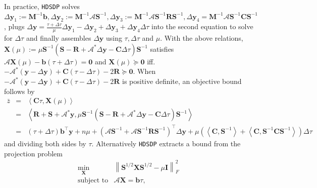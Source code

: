 \documentclass[10pt]{article}
\begin{document}
{In practice, {{\texttt{HDSDP}}} solves $\Delta \mathbf{y}_1 := \mathbf{M}^{- 1} \mathbf{b},
\Delta \mathbf{y}_2 := \mathbf{M}^{- 1} \mathcal{A} \mathbf{S}^{- 1}, \Delta \mathbf{y}_3 := \mathbf{M}^{- 1} \mathcal{A}
\mathbf{S}^{- 1} \mathbf{R} \mathbf{S}^{- 1}, \Delta \mathbf{y}_4 = \mathbf{M}^{- 1} \mathcal{A} \mathbf{S}^{- 1} \mathbf{C} \mathbf{S}^{-
1}$, plugs $\Delta \mathbf{y} = \frac{\tau + \Delta \tau}{\mu} \Delta \mathbf{y}_1 - \Delta
\mathbf{y}_2 + \Delta \mathbf{y}_3 + \Delta \mathbf{y}_4 \Delta \tau$ into the second equation to
solve for $\Delta \tau$ and finally assembles $\Delta \mathbf{y}$ using $\tau, \Delta
\tau$ and $\mu$. With the above relations, $\mathbf{X} (\mu) := \mu \mathbf{S}^{- 1}
\left( \mathbf{S} - \mathbf{R} +\mathcal{A}^{\ast} \Delta \mathbf{y} - \mathbf{C} \Delta \tau \right) \mathbf{S}^{-
1}$ satisfies $\mathcal{A} \mathbf{X} (\mu) - \mathbf{b} (\tau + \Delta \tau) = \textbf{0}$ and $\mathbf{X} (\mu)
\succeq \textbf{0}$ iff. $-\mathcal{A}^{\ast} \left( \mathbf{y} - \Delta \mathbf{y} \right) + \mathbf{C} (\tau
- \Delta \tau) - 2 \mathbf{R} \succeq \textbf{0}$. When $-\mathcal{A}^{\ast} \left( \mathbf{y} -
\Delta \mathbf{y} \right) + \mathbf{C} (\tau - \Delta \tau) - 2 \mathbf{R}$ is positive definite, an
objective bound follows by
\begin{eqnarray*}
  \bar{z} & = & \left\langle \mathbf{C} \tau, \mathbf{X} (\mu) \right\rangle\\
  & = & \left\langle \mathbf{R} + \mathbf{S} + \mathcal{A}^{\ast} \mathbf{y}, \mu \mathbf{S}^{- 1} \left( \mathbf{S} - \mathbf{R}
  +\mathcal{A}^{\ast} \Delta \mathbf{y} - \mathbf{C} \Delta \tau \right) \mathbf{S}^{- 1}
  \right\rangle\\
  & = & (\tau + \Delta \tau) \mathbf{b}^{\top} \mathbf{y} + n \mu + \left( \mathcal{A} \mathbf{S}^{- 1} +
  \mathcal{A} \mathbf{S}^{- 1} \mathbf{R} \mathbf{S}^{- 1} \right)^{\top} \Delta \mathbf{y} + \mu \left(
  \left\langle \mathbf{C}, \mathbf{S}^{- 1} \right\rangle + \left\langle \mathbf{C}, \mathbf{S}^{- 1} \mathbf{C}
  \mathbf{S}^{- 1} \right\rangle \right) \Delta \tau
\end{eqnarray*}
and dividing both sides by $\tau$. Alternatively {{\texttt{HDSDP}}} extracts a
bound from the projection problem
\begin{eqnarray*}
  \min_{\mathbf{X}} & \left\| \mathbf{S}^{1 / 2} \mathbf{X} \mathbf{S}^{1 / 2} - \mu \mathbf{I} \right\|_F^2 & \\
  \text{subject to} & \mathcal{A} \mathbf{X} = \mathbf{b} \tau, & 
\end{eqnarray*}
}
\end{document}
